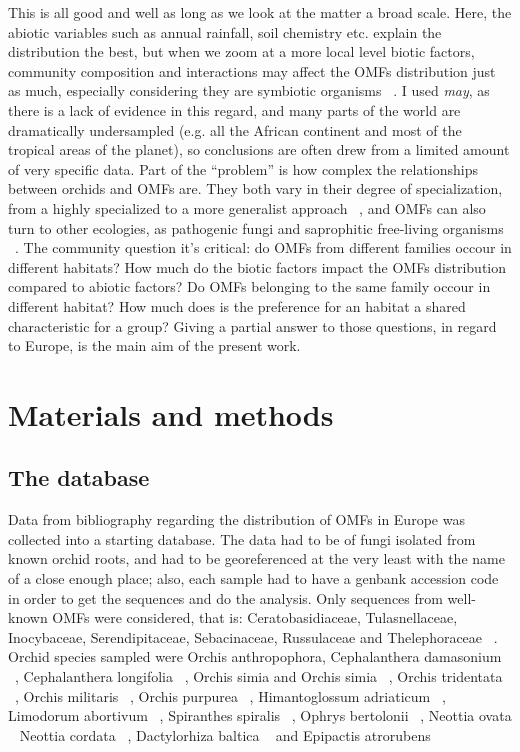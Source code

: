This is all good and well as long as we look at the matter a broad scale. Here, the abiotic variables such as annual rainfall, soil chemistry etc. explain the distribution the best, but when we zoom at a more local level biotic factors, community composition and interactions may affect the OMFs distribution just as much, especially considering they are symbiotic organisms ~\citep{jacquemyn2017}. I used \emph{may}, as there is a lack of evidence in this regard, and many parts of the world are dramatically undersampled (e.g. all the African continent and most of the tropical areas of the planet), so conclusions are often drew from a limited amount of very specific data. Part of the ``problem'' is how complex the relationships between orchids and OMFs are. They both vary in their degree of specialization, from a highly specialized to a more generalist approach ~\citep{mccormick2004, girlanda2011, heijden2015}, and OMFs can also turn to other ecologies, as pathogenic fungi and saprophitic free-living organisms ~\citep{veldre2013}.
The community question it's critical: do OMFs from different families occour in different habitats? How much do the biotic factors impact the OMFs distribution compared to abiotic factors?
Do OMFs belonging to the same family occour in different habitat? How much does is the preference for an habitat a shared characteristic for a group?
Giving a partial answer to those questions, in regard to Europe, is the main aim of the present work.

\part{Materials and methods}
\label{materialsandmethods}

\chapter{The database}
\label{thedatabase}

Data from bibliography regarding the distribution of OMFs in Europe was collected into a starting database. The data had to be of fungi isolated from known orchid roots, and had to be georeferenced at the very least with the name of a close enough place; also, each sample had to have a genbank accession code in order to get the sequences and do the analysis.
Only sequences from well-known OMFs were considered, that is: Ceratobasidiaceae, Tulasnellaceae, Inocybaceae, Serendipitaceae, Sebacinaceae, Russulaceae and Thelephoraceae ~\citep{dearnaley2012}.
Orchid species sampled were Orchis anthropophora, Cephalanthera damasonium ~\citep{julou2005}, Cephalanthera longifolia ~\citep{pecoraro2017}, Orchis simia and Orchis simia ~\citep{schatz2010, lievens2010}, Orchis tridentata ~\citep{pecoraro2012}, Orchis militaris ~\citep{shefferson2008}, Orchis purpurea ~\citep{lievens2010}, Himantoglossum adriaticum ~\citep{pecoraro2013}, Limodorum abortivum ~\citep{girlanda2005}, Spiranthes spiralis ~\citep{duffy2019}, Ophrys bertolonii ~\citep{pecoraro2015}, Neottia ovata ~\citep{hansjacquemyn2015, tesitelova2015} Neottia cordata ~\citep{tesitelova2015}, Dactylorhiza baltica ~\citep{shefferson2008} and Epipactis atrorubens ~\citep{shefferson2008}

